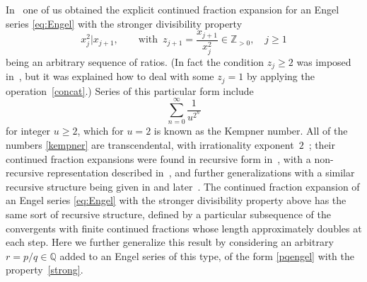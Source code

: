 \documentclass[10pt, a4paper]{amsart}
\numberwithin{equation}{section}
\theoremstyle{plain}
\theoremstyle{definition}
\newcommand{\Zp}{\mathbb{Z}_{>0}}
\newcommand{\Q}{\mathbb{Q}}
\begin{document}
In~\cite{Hone2} one of us obtained the explicit continued fraction expansion 
for an Engel series \eqref{eq:Engel} with %
the stronger 
divisibility property 
\begin{equation}
\label{strong} 
x_j^2|x_{j+1},  \qquad 
\text{with} \,\,\,
z_{j+1}=\frac{x_{j+1}}{x_j^2} \in \Zp, \quad  j\geq 1
\end{equation}
being an arbitrary sequence of ratios. 
(In fact the condition $z_j\geq 2$ was imposed in~\cite{Hone2},
but it was explained how to deal with some $z_j=1$ by applying the 
operation~\eqref{concat}.) 
Series of this particular form include  %
\begin{equation}
\label{kempner} 
\sum_{n=0}^\infty \frac{1}{u^{2^n}} 
\end{equation} 
for integer $u\geq 2$, which for $u=2$ is known as the Kempner number. 
All of the numbers \eqref{kempner} 
are transcendental, with irrationality exponent~$2$~\cite{bugeaudetal}; 
their continued fraction expansions were  found in 
recursive form in~\cite{shallit1}, with a non-recursive representation 
described in~\cite{shallit2}, and further generalizations with a 
similar recursive structure being given in \cite{shallit3} and later~\cite{folded}. 
The continued fraction expansion of an Engel 
series \eqref{eq:Engel} %
with the stronger 
divisibility property above has the same sort of 
recursive structure, defined by a particular subsequence of the 
convergents with finite continued fractions  whose length approximately 
doubles at each step. Here we 
further generalize this result by considering an arbitrary 
$r=p/q\in\Q$ added to an Engel series of this type, 
of the form \eqref{pqengel} with the property~\eqref{strong}. 
\end{document}
